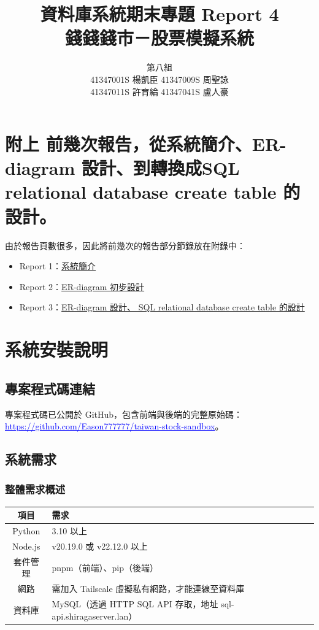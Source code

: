 \documentclass[UTF8, a4paper, 12pt, fontset=none]{ctexart}
\title{\vspace{-2.5cm}資料庫系統期末專題 Report 4\\ \textbf{錢錢錢市－股票模擬系統}}
\author{
    \begin{tabular}{c}
        第八組 \\ 
        41347001S 楊凱臣 \quad 41347009S 周聖詠 \\ 
        41347011S 許育綸 \quad 41347041S 盧人豪
    \end{tabular}
}
\date{}
\let\oldhref\href
\renewcommand{\href}[2]{\oldhref{#1}{\textcolor{blue}{\uline{#2}}}}
\begin{document}
\maketitle

\section{\small 附上 前幾次報告，從系統簡介、ER-diagram 設計、到轉換成SQL relational database create table 的設計。}
由於報告頁數很多，因此將前幾次的報告部分節錄放在附錄中：

\begin{itemize}
    \item Report 1：\hyperref[sec:report1]{系統簡介}
    \item Report 2：\hyperref[sec:report2]{ER-diagram 初步設計}
    \item Report 3：\hyperref[sec:report3]{ER-diagram 設計、 SQL relational database create table 的設計}
\end{itemize}
\section{系統安裝說明}

\subsection{專案程式碼連結}
專案程式碼已公開於 GitHub，包含前端與後端的完整原始碼：\\\href{https://github.com/Eason777777/taiwan-stock-sandbox}{https://github.com/Eason777777/taiwan-stock-sandbox}。
\subsection{系統需求}

\subsubsection{整體需求概述}
\begin{center}
\begin{tabular}{|c|p{10cm}|}
    \hline
    項目 & 需求 \\
    \hline
    Python & 3.10 以上 \\
    \hline
    Node.js & v20.19.0 或 v22.12.0 以上\\
    \hline
    套件管理 & pnpm（前端）、pip（後端） \\
    \hline
    網路 & 需加入 Tailscale 虛擬私有網路，才能連線至資料庫 \\
    \hline
    資料庫 & MySQL（透過 HTTP SQL API 存取，地址 sql-api.shiragaserver.lan） \\
    \hline
\end{tabular}
\end{center}
\end{document}
